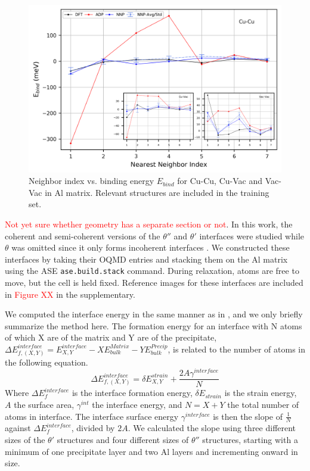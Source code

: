 \documentclass{article}
\begin{document}
\begin{figure}[H]%
\centering%
\includegraphics[width=1.2\textwidth,center]{./figures/solsol_in_al.png}%
\caption{Neighbor index vs. binding energy $E_{bind}$ for Cu-Cu, Cu-Vac and Vac-Vac in Al matrix. 
Relevant structures are included in the training set.}%
\label{fig:solsol_in_al}
\end{figure}

\textcolor{red}{Not yet sure whether geometry has a separate section or not}.
In this work, the coherent and semi-coherent versions of the $\theta''$ and $\theta'$ interfaces were studied while $\theta$ was omitted since it only forms incoherent interfaces \cite{Nie2014PhysicalAlloys}.
We constructed these interfaces by taking their OQMD entries and stacking them on the Al matrix using the ASE \texttt{ase.build.stack} command.
During relaxation, atoms are free to move, but the cell is held fixed. 
Reference images for these interfaces are included in \textcolor{red}{Figure XX} in the supplementary.

We computed the interface energy in the same manner as in \cite{Vaithyanathan2004MultiscaleAlloys}, and we only briefly summarize the method here.
The formation energy for an interface with N atoms of which X are of the matrix and Y are of the precipitate,
$\Delta E^{interface}_{f, (X,Y)} = E^{interface}_{X,Y}-XE^{Matrix}_{bulk}-YE^{Precip}_{bulk}$,
is related to the number of atoms in the following equation. 
\begin{equation}
\Delta E^{interface}_{f,(X,Y)} = \delta E^{strain}_{X,Y} + \frac{2A\gamma^{interface}}{N}
\end{equation}
Where $\Delta E^{interface}_f$ is the interface formation energy, $\delta E_{strain}$ is the strain energy, $A$ the surface area,
$\gamma^{int}$ the interface energy, and $N=X+Y$ the total number of atoms in interface.
The interface surface energy $\gamma^{interface}$ is then the slope of $\frac{1}{N}$ against
$\Delta E^{interface}_f$, divided by $2A$.
We calculated the slope using three different sizes of the $\theta'$ structures and four different sizes of $\theta''$ structures, starting with a minimum of one precipitate layer and two Al layers and incrementing onward in size. 
\end{document}
